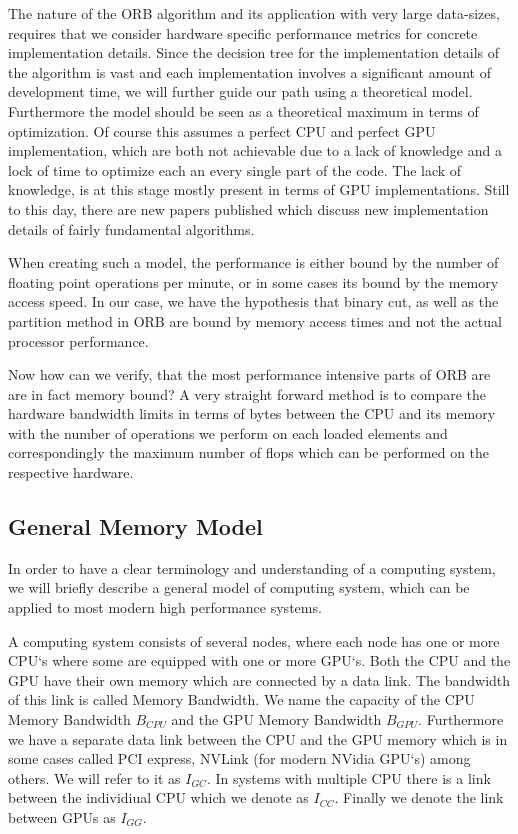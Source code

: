 \documentclass[]{article}
\begin{document}
The nature of the ORB algorithm and its application with very large data-sizes, requires that we consider hardware specific performance metrics for concrete implementation details. Since the decision tree for the implementation details of the algorithm is vast and each implementation involves a significant amount of development time, we will further guide our path using a theoretical model. Furthermore the model should be seen as a theoretical maximum in terms of optimization. Of course this assumes a perfect CPU and perfect GPU implementation, which are both not achievable due to a lack of knowledge and a lock of time to optimize each an every single part of the code. The lack of knowledge, is at this stage mostly present in terms of GPU implementations. Still to this day, there are new papers published which discuss new implementation details of fairly fundamental algorithms. 

When creating such a model, the performance is either bound by the number of floating point operations per minute, or in some cases its bound by the memory access speed. In our case, we have the hypothesis that binary cut, as well as the partition method in ORB are bound by memory access times and not the actual processor performance.

Now how can we verify, that the most performance intensive parts of ORB are are in fact memory bound? A very straight forward method is to compare the hardware bandwidth limits in terms of bytes between the CPU and its memory with the number of operations we perform on each loaded elements and correspondingly the maximum number of flops which can be performed on the respective hardware.


\subsection{General Memory Model}

In order to have a clear terminology and understanding of a computing system, we will briefly describe a general model of computing system, which can be applied to most modern high performance systems.

A computing system consists of several nodes, where each node has one or more CPU`s where some are equipped with one or more GPU`s. Both the CPU and the GPU have their own memory which are connected by a data link. The bandwidth of this link is called Memory Bandwidth. We name the capacity of the CPU Memory Bandwidth $B_{CPU}$ and the GPU Memory Bandwidth $B_{GPU}$. Furthermore we have a separate data link between the CPU and the GPU memory which is in some cases called PCI express, NVLink (for modern NVidia GPU`s) among others. We will refer to it as $I_{GC}$. In systems with multiple CPU there is a link between the individiual CPU which we denote as $I_{CC}$. Finally we denote the link between GPUs as $I_{GG}$.
\end{document}
